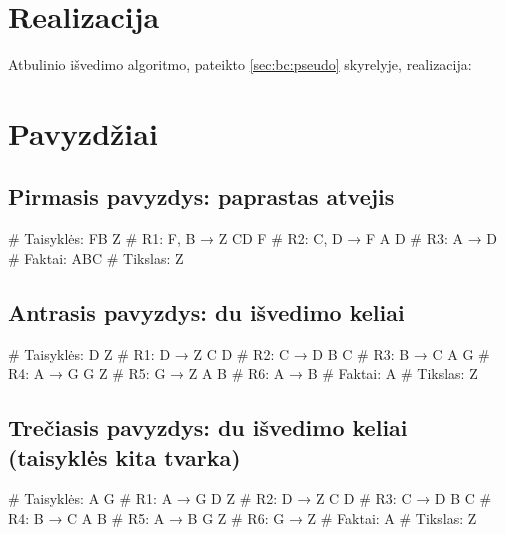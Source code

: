 \section{Realizacija}

Atbulinio išvedimo algoritmo, pateikto \ref{sec:bc:pseudo}
skyrelyje, realizacija:


\section{Pavyzdžiai}

\subsection{Pirmasis pavyzdys: paprastas atvejis}

\begin{pythonaienv}[bc]
# Taisyklės:
FB Z                                    # R1: F, B → Z
CD F                                    # R2: C, D → F
A D                                     # R3: A → D
# Faktai:
ABC
# Tikslas:
Z
\end{pythonaienv}

\subsection{Antrasis pavyzdys: du išvedimo keliai}

\begin{pythonaienv}[bc]
# Taisyklės:
D Z                                     # R1: D → Z
C D                                     # R2: C → D
B C                                     # R3: B → C
A G                                     # R4: A → G
G Z                                     # R5: G → Z
A B                                     # R6: A → B
# Faktai:
A
# Tikslas:
Z
\end{pythonaienv}

\subsection{Trečiasis pavyzdys: du išvedimo keliai (taisyklės kita tvarka)}

\begin{pythonaienv}[bc]
# Taisyklės:
A G                                     # R1: A → G
D Z                                     # R2: D → Z
C D                                     # R3: C → D
B C                                     # R4: B → C
A B                                     # R5: A → B
G Z                                     # R6: G → Z
# Faktai:
A
# Tikslas:
Z
\end{pythonaienv}

